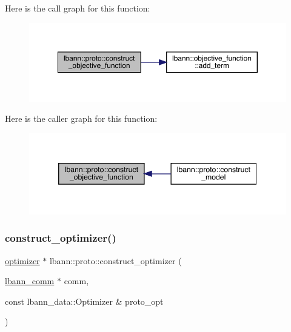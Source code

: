 Here is the call graph for this function\+:\nopagebreak
\begin{figure}[H]
\begin{center}
\leavevmode
\includegraphics[width=350pt]{namespacelbann_1_1proto_a2b55ede441a057291e047cf4e7352481_cgraph}
\end{center}
\end{figure}
Here is the caller graph for this function\+:\nopagebreak
\begin{figure}[H]
\begin{center}
\leavevmode
\includegraphics[width=346pt]{namespacelbann_1_1proto_a2b55ede441a057291e047cf4e7352481_icgraph}
\end{center}
\end{figure}
\mbox{\label{namespacelbann_1_1proto_af85d2b9f1e986bbab4feccfaa19c9960}} 
\subsubsection{\texorpdfstring{construct\+\_\+optimizer()}{construct\_optimizer()}}
{\footnotesize\ttfamily \hyperlink{classlbann_1_1optimizer}{optimizer} $\ast$ lbann\+::proto\+::construct\+\_\+optimizer (\begin{DoxyParamCaption}\item[{\hyperlink{classlbann_1_1lbann__comm}{lbann\+\_\+comm} $\ast$}]{comm,  }\item[{const lbann\+\_\+data\+::\+Optimizer \&}]{proto\+\_\+opt }\end{DoxyParamCaption})}


